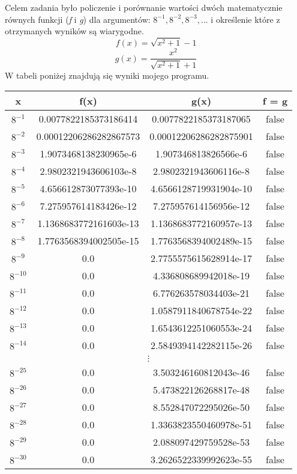 \documentclass[]{article}
\begin{document}
	Celem zadania było policzenie i porównanie wartości dwóch matematycznie równych funkcji (\textit{f} i \textit{g}) dla argumentów: \(8^{-1}, 8^{-2}, 8^{-3}, ...\) i określenie które z otrzymanych wyników są wiarygodne.
	\[f(x) = \sqrt{x^2 + 1} - 1\]
	\[g(x) = \frac{x^2}{\sqrt{x^2 + 1} + 1}\]
	W tabeli poniżej znajdują się wyniki mojego programu.
	\begin{table}[!h]
		\centering
		\label{tab:table1}
		\begin{tabular}{|c|c|c|c|}
			\hline
			x & f(x) & g(x) & f = g \\ \hline
			$8^{-1}$ & 0.0077822185373186414 & 0.0077822185373187065 & false \\ \hline
			$8^{-2}$ & 0.00012206286282867573 & 0.00012206286282875901 & false \\ \hline
			$8^{-3}$ & 1.9073468138230965e-6 & 1.907346813826566e-6 & false \\ \hline
			$8^{-4}$ & 2.9802321943606103e-8 & 2.9802321943606116e-8 & false \\ \hline
			$8^{-5}$ & 4.656612873077393e-10 & 4.6566128719931904e-10 & false \\ \hline
			$8^{-6}$ & 7.275957614183426e-12 & 7.275957614156956e-12 & false \\ \hline
			$8^{-7}$ & 1.1368683772161603e-13 & 1.1368683772160957e-13 & false \\ \hline
			$8^{-8}$ & 1.7763568394002505e-15 & 1.7763568394002489e-15 & false \\ \hline
			$8^{-9}$ & 0.0 & 2.7755575615628914e-17 & false \\ \hline
			$8^{-10}$ & 0.0 & 4.336808689942018e-19 & false \\ \hline
			$8^{-11}$ & 0.0 & 6.776263578034403e-21 & false \\ \hline
			$8^{-12}$ & 0.0 & 1.0587911840678754e-22 & false \\ \hline
			$8^{-13}$ & 0.0 & 1.6543612251060553e-24 & false \\ \hline
			$8^{-14}$ & 0.0 & 2.5849394142282115e-26 & false \\ \hline
			\multicolumn{4}{c}{$\vdots$} \\ \hline
			$8^{-25}$ & 0.0 & 3.503246160812043e-46 & false \\ \hline
			$8^{-26}$ & 0.0 & 5.473822126268817e-48 & false \\ \hline
			$8^{-27}$ & 0.0 & 8.552847072295026e-50 & false \\ \hline
			$8^{-28}$ & 0.0 & 1.3363823550460978e-51 & false \\ \hline
			$8^{-29}$ & 0.0 & 2.088097429759528e-53 & false \\ \hline
			$8^{-30}$ & 0.0 & 3.2626522339992623e-55 & false \\ \hline
		\end{tabular}
	\end{table}
\end{document}
